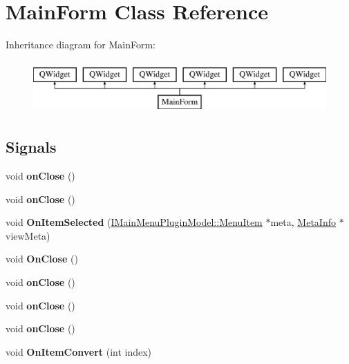 \hypertarget{class_main_form}{}\section{Main\+Form Class Reference}
\label{class_main_form}
Inheritance diagram for Main\+Form\+:\begin{figure}[H]
\begin{center}
\leavevmode
\includegraphics[height=2.000000cm]{class_main_form}
\end{center}
\end{figure}
\subsection*{Signals}
\begin{DoxyCompactItemize}
\item 
\mbox{\label{class_main_form_af5c793d14da28ffb85334e9788f64756}} 
void {\bfseries on\+Close} ()
\item 
\mbox{\label{class_main_form_af5c793d14da28ffb85334e9788f64756}} 
void {\bfseries on\+Close} ()
\item 
\mbox{\label{class_main_form_add09750f28044115c869ec8f6d6b86ef}} 
void {\bfseries On\+Item\+Selected} (\hyperlink{struct_i_main_menu_plugin_model_1_1_menu_item}{I\+Main\+Menu\+Plugin\+Model\+::\+Menu\+Item} $\ast$meta, \hyperlink{struct_meta_info}{Meta\+Info} $\ast$view\+Meta)
\item 
\mbox{\label{class_main_form_ae51e9ea97c7c12d0d8b59cb295f8018b}} 
void {\bfseries On\+Close} ()
\item 
\mbox{\label{class_main_form_af5c793d14da28ffb85334e9788f64756}} 
void {\bfseries on\+Close} ()
\item 
\mbox{\label{class_main_form_af5c793d14da28ffb85334e9788f64756}} 
void {\bfseries on\+Close} ()
\item 
\mbox{\label{class_main_form_af5c793d14da28ffb85334e9788f64756}} 
void {\bfseries on\+Close} ()
\item 
\mbox{\label{class_main_form_a9f87a145f41c5b1bf064415f79423586}} 
void {\bfseries On\+Item\+Convert} (int index)
\end{DoxyCompactItemize}
